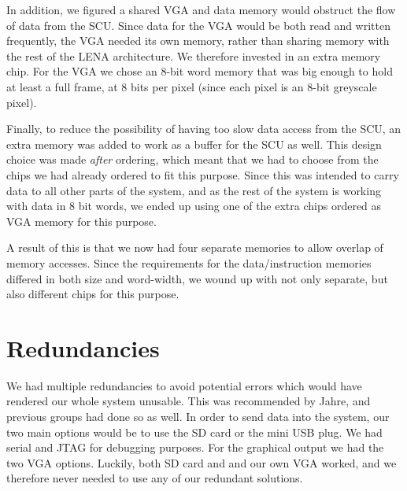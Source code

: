 In addition, we figured a shared \ac{VGA} and data memory would obstruct the
flow of data from the \ac{SCU}. Since data for the \ac{VGA} would be both read
and written frequently, the \ac{VGA} needed its own memory, rather than sharing
memory with the rest of the LENA architecture. We
therefore invested in an extra memory chip. For the VGA we chose an 8-bit word
memory that was big enough to hold at least a full frame, at 8 bits per
pixel (since each pixel is an 8-bit greyscale pixel).

Finally, to reduce the possibility of having too slow data access from the SCU,
an extra memory was added to work as a buffer
for the SCU as well. This design choice was made {\em after} ordering, which
meant that we had to choose from the chips we had already ordered to fit this
purpose. Since this was intended to carry data to all other parts of the system,
and as the rest of the system is working with data in 8 bit words, we ended up
using one of the extra chips ordered as \ac{VGA} memory for this purpose.

A result of this is that we now had four separate memories to allow overlap of
memory accesses. Since the requirements for the data/instruction memories
differed in both size and word-width, we wound up with not only separate, but
also different chips for this purpose.

\section{Redundancies}
We had multiple redundancies to avoid potential errors which would have rendered
our whole system unusable. This was recommended by Jahre, and previous groups
had done so as well. In order to send data into the system, our two main options
would be to use the \ac{SD} card or the mini \ac{USB} plug. We had serial and
\ac{JTAG} for debugging purposes. For the graphical output we had the two
\ac{VGA} options. Luckily, both \ac{SD} card and and our own \ac{VGA} worked,
and we therefore never needed to use any of our redundant solutions.
